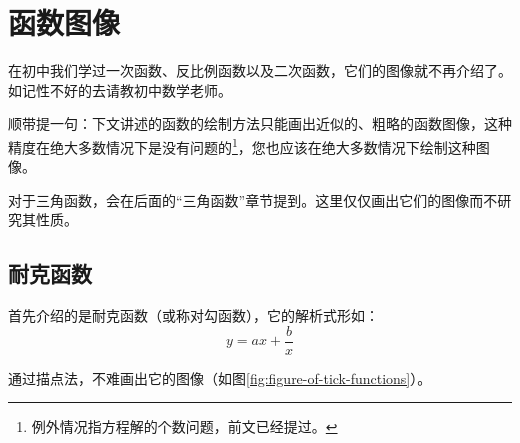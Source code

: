 \section{函数图像}\label{sec:functionProperty-graphOfFunctions}
在初中我们学过一次函数、反比例函数以及二次函数，它们的图像就不再介绍了。如记性不好的去请教初中数学老师。

顺带提一句：下文讲述的函数的绘制方法只能画出近似的、粗略的函数图像，这种精度在绝大多数情况下是没有问题的\footnote{例外情况指方程解的个数问题，前文已经提过。}，您也应该在绝大多数情况下绘制这种图像。

对于三角函数，会在后面的“三角函数”章节提到。这里仅仅画出它们的图像而不研究其性质。

\subsection{耐克函数}
首先介绍的是耐克函数（或称对勾函数），它的解析式形如：\[y=ax+\frac{b}{x}\]

通过描点法，不难画出它的图像（如图\ref{fig:figure-of-tick-functions}）。

